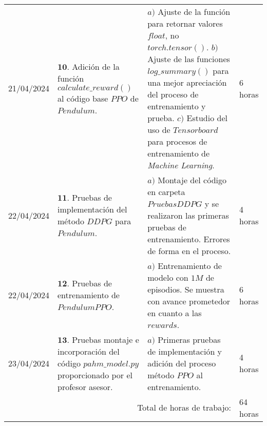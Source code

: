 \documentclass[12pt]{article}
\begin{document}



\hfill\\
\begin{minipage}[h]{\textwidth}
	\centering
	\begin{tabularx}{\textwidth}{|p{2cm}|X|X|p{2cm}|} 
		\hline		
	 	21/04/2024 & 
	 	$\mathbf{10}.$ Adición de la función $calculate\_reward()$ al código base $PPO$ de $Pendulum$. &
	 	$a)$ Ajuste de la función para retornar valores $float$, no $torch.tensor()$. \newline
	 	$b)$ Ajuste de las funciones $log\_summary()$ para una mejor apreciación del proceso de entrenamiento y prueba. \newline
	 	$c)$ Estudio del uso de $Tensorboard$ para procesos de entrenamiento de \textit{Machine Learning}. \newline & 
	 	6 horas \\
	 	22/04/2024 & 
	 	$\mathbf{11}.$ Pruebas de implementación del método \href{https://github.com/schneimo/ddpg-pytorch/tree/master}{$DDPG$} para $Pendulum$. &
	 	$a)$ Montaje del código en carpeta $PruebasDDPG$ y se realizaron las primeras pruebas de entrenamiento. Errores de forma en el proceso. \newline & 
	 	4 horas \\
	 	22/04/2024 & 
	 	$\mathbf{12}.$ Pruebas de entrenamiento de $PendulumPPO$. &
	 	$a)$ Entrenamiento de modelo con $1M$ de episodios. Se muestra con avance prometedor en cuanto a las $rewards$. \newline & 
	 	6 horas \\
	 	23/04/2024 & 
	 	$\mathbf{13}.$ Pruebas montaje e incorporación del código $pahm\_model.py$ proporcionado por el profesor asesor. &
	 	$a)$ Primeras pruebas de implementación y adición del proceso método $PPO$ al entrenamiento. \newline & 
	 	4 horas \\
	 	
	 	\hline
		\multicolumn{3}{|r|}{Total de horas de trabajo:} & 64 horas \\ 
	 	\hline                 
	\end{tabularx}
\end{minipage}
\end{document}
